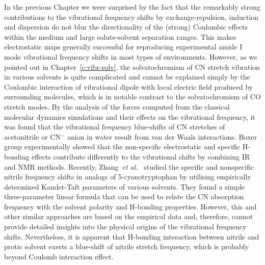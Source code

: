 \documentclass[b5paper,oneside,fleqn,11pt]{book}
\begin{document}
\begin{refsection}
In the previous Chapter we were surprised by the fact that the remarkably strong
contributions to the vibrational frequency shifts by exchange\hyp{}repulsion,
induction and dispersion do not blur the directionality of the (strong)
Coulombic effects within the medium and large solute\hyp{}solvent separation ranges. 
This makes electrostatic maps generally successful for 
reproducing experimental amide I mode vibrational frequency shifts
in most types of environments. However, as we pointed out in Chapter~\ref{c:vibr-solv}, 
the solvatochromism of CN
stretch vibration in various solvents is quite complicated and
cannot be explained simply by the Coulombic interaction of
vibrational dipole with local electric field produced by
surrounding molecules, \citep{Ben-Amotz.Lee.Cho.List.JCP.1992,
Rey.Hynes.JCP.1998,
Reimers.Hall.JACS.1999,Fafarman.Sigala.Herschlag.Boxer.JACS.2010,
Morales.Thompson.JPCB.2011,
Wilderen.Luuk.Kern-Michler.Muller-Werkmeister.Bredenbeck.PCCP.2014}
%
which is in notable contrast to the
solvatochromism of CO stretch modes. \citep{Fried.Boxer.AccChemRes.2015,
Lee.Choi.Cho.JCP.2012,Fried.Bagchi.Boxer.JACS.2013}
%
By the analysis
of the forces computed from the classical molecular dynamics
simulations and their effects on the vibrational frequency, it
was found that the vibrational frequency blue\hyp{}shifts of CN
stretches of acetonitrile or CN$^-$ anion in water result from van
der Waals interactions. \citep{Rey.Hynes.JCP.1998,Morales.Thompson.JPCB.2011}
Boxer group experimentally showed that the non\hyp{}specific electrostatic and specific H-bonding
effects contribute differently to the vibrational shifts
by combining IR and NMR methods. \citep{Fafarman.Sigala.Herschlag.Boxer.JACS.2010,
Bagchi.Fried.Boxer.JACS.2012}
% 
Recently, Zhang~\emph{et al.}~\citep{Zhang.Markiewicz.Doerksen.Smith.Gai.PCCP.2015} 
studied
the specific and nonspecific nitrile frequency shifts in analogs
of 5-cyanotryptophan by utilising empirically determined
Kamlet\hyp{}Taft parameters \citep{Kamlet.Taft.JACS.1976,Taft.Kamlet.JACS.1976,
Kamlet.Abboud.Taft.JACS.1977}
%
of various solvents. They found a
simple three\hyp{}parameter linear formula that can be used to
relate the CN absorption frequency with the solvent polarity
and H-bonding properties. However, this and other similar
approaches \citep{Reimers.Hall.JACS.1999} 
are based on the empirical data and, therefore,
cannot provide detailed insights into the physical origins of the
vibrational frequency shifts. Nevertheless, it is apparent that
H-bonding interaction between nitrile and protic solvent exerts
a blue\hyp{}shift of nitrile stretch frequency, which is probably
beyond Coulomb interaction effect. 


\end{refsection}
\end{document}
